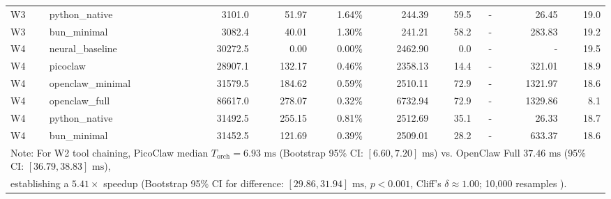 \begin{table}[t]
\begin{tabular}{llrrrrrrrr}
W3 & python\_native & 3101.0 & 51.97 & 1.64\% & 244.39 & 59.5 & - & 26.45 & 19.0 \\
W3 & bun\_minimal & 3082.4 & 40.01 & 1.30\% & 241.21 & 58.2 & - & 283.83 & 19.2 \\
\midrule
W4 & neural\_baseline & 30272.5 & 0.00 & 0.00\% & 2462.90 & 0.0 & - & - & 19.5 \\
W4 & picoclaw & 28907.1 & 132.17 & 0.46\% & 2358.13 & 14.4 & - & 321.01 & 18.9 \\
W4 & openclaw\_minimal & 31579.5 & 184.62 & 0.59\% & 2510.11 & 72.9 & - & 1321.97 & 18.6 \\
W4 & openclaw\_full & 86617.0 & 278.07 & 0.32\% & 6732.94 & 72.9 & - & 1329.86 & 8.1 \\
W4 & python\_native & 31492.5 & 255.15 & 0.81\% & 2512.69 & 35.1 & - & 26.33 & 18.7 \\
W4 & bun\_minimal & 31452.5 & 121.69 & 0.39\% & 2509.01 & 28.2 & - & 633.37 & 18.6 \\
\midrule
\multicolumn{10}{l}{\footnotesize Note: For W2 tool chaining, PicoClaw median $T_{\text{orch}} = 6.93\text{ ms}$ (Bootstrap 95\% CI: $[6.60, 7.20]\text{ ms}$) vs. OpenClaw Full $37.46\text{ ms}$ (95\% CI: $[36.79, 38.83]\text{ ms}$),} \\
\multicolumn{10}{l}{\footnotesize establishing a $5.41\times$ speedup (Bootstrap 95\% CI for difference: $[29.86, 31.94]\text{ ms}$, $p < 0.001$, Cliff's $\delta \approx 1.00$; 10,000 resamples \cite{efron1979}).} \\
\bottomrule
\end{tabular}
\end{table}
